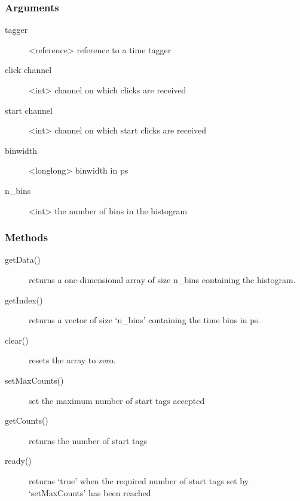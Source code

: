 \documentclass[letterpaper,10pt,english]{sphinxmanual}
\begin{document}
\subsubsection{Arguments}
\label{sections/api:id10}\begin{description}
\item[{tagger}] \leavevmode
\textless{}reference\textgreater{} reference to a time tagger

\item[{click channel}] \leavevmode
\textless{}int\textgreater{} channel on which clicks are received

\item[{start channel}] \leavevmode
\textless{}int\textgreater{} channel on which start clicks are received

\item[{binwidth}] \leavevmode
\textless{}longlong\textgreater{} binwidth in ps

\item[{n\_bins}] \leavevmode
\textless{}int\textgreater{} the number of bins in the histogram

\end{description}


\subsubsection{Methods}
\label{sections/api:id11}\begin{description}
\item[{getData()}] \leavevmode
returns a one-dimensional array of size n\_bins containing the histogram.

\item[{getIndex()}] \leavevmode
returns a vector of size `n\_bins' containing the time bins in ps.

\item[{clear()}] \leavevmode
resets the array to zero.

\item[{setMaxCounts()}] \leavevmode
set the maximum number of start tags accepted

\item[{getCounts()}] \leavevmode
returns the number of start tags

\item[{ready()}] \leavevmode
returns `true' when the required number of start tags set by `setMaxCounts' has been reached

\end{description}
\end{document}
